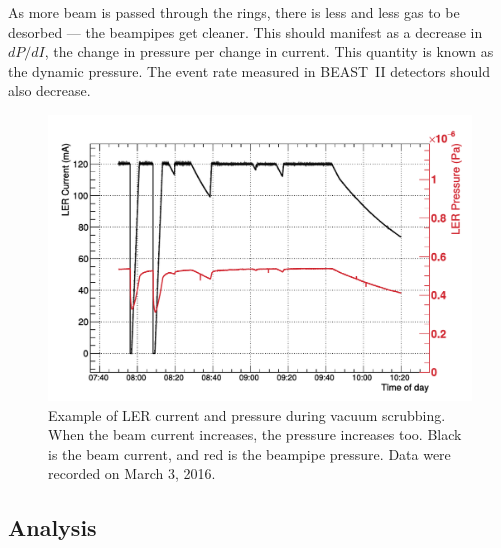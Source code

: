 	As more beam is passed through the rings, there is less and less gas to be desorbed --- the beampipes get cleaner. This should manifest as a decrease in $dP/dI$, the change in pressure per change in current. This quantity is known as the dynamic pressure. The event rate measured in BEAST~II detectors should also decrease.






\begin{figure}[htb]
	\centerfloat
		\includegraphics[trim={0 0 0 0.75cm},clip, width=\textwidth]{images/LER_PreAndCur}
	\caption[Example of LER current and pressure during vacuum scrubbing]{Example of LER current and pressure during vacuum scrubbing. When the beam current increases, the pressure increases too. Black is the beam current, and red is the beampipe pressure. Data were recorded on March 3, 2016.}
	\label{fig:LERPRECUR}
\end{figure}



\subsection{Analysis}


